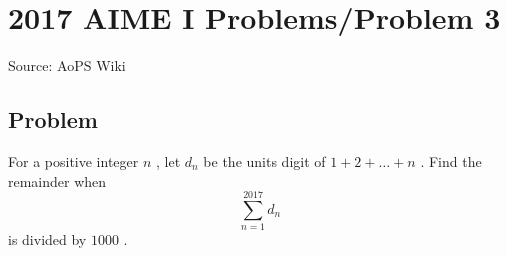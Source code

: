 \documentclass[12pt]{article}
\begin{document}
\section*{{2017 AIME I Problems/Problem 3}}
Source: AoPS Wiki

\subsection*{Problem}
For a positive integer $n$ , let $d_n$ be the units digit of $1 + 2 + \dots + n$ . Find the remainder when \[\sum_{n=1}^{2017} d_n\] is divided by $1000$ .
\end{document}
